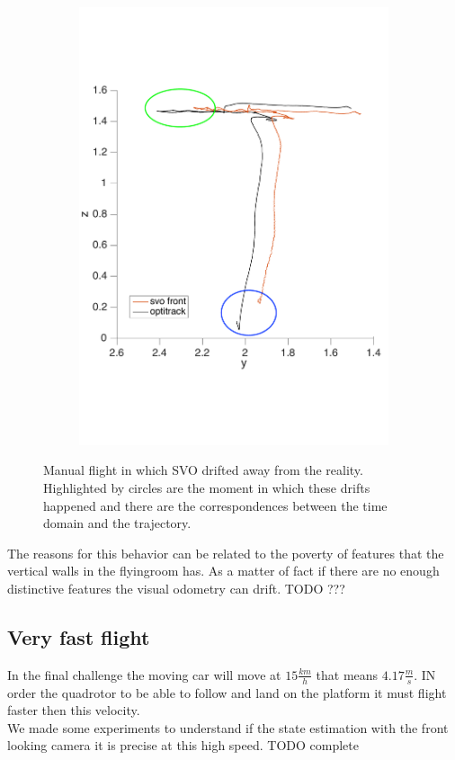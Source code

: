 \begin{figure}[!htbp]
\begin{subfigure}[b]{0.4\textwidth}
        \includegraphics[width=\textwidth]{img/fly_with_landing_trajectory_y.pdf}
        \label{fig:comparision_svo_position_drifting_y}
   \end{subfigure}
  \caption{Manual flight in which SVO drifted away from the reality. Highlighted by circles are the moment in which these drifts happened and there are the correspondences between the time domain and the trajectory. }
  \label{fig:svo_position_driftind}
\end{figure} 

The reasons for this behavior can be related to the poverty of features that the vertical walls in the flyingroom has. As a matter of fact if there are no enough distinctive features the visual odometry can drift. TODO ???

\subsection{Very fast flight}
In the final challenge the moving car will move at $15\frac{km}{h}$ that means $4.17\frac{m}{s}$. IN order the quadrotor to be able to follow and land on the platform it must flight faster then this velocity.\\
We made some experiments to understand if the state estimation with the front looking camera it is precise at this high speed. TODO complete


